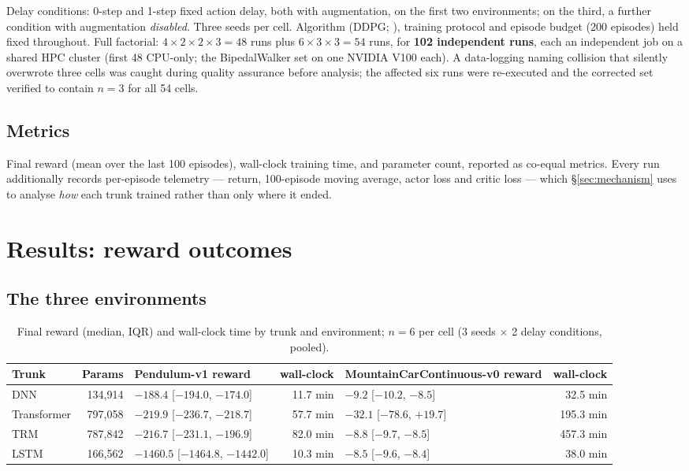 \documentclass[11pt]{article}
\begin{document}
Delay conditions: 0-step and 1-step fixed action delay, both with augmentation, on the first two environments; on the third, a further condition with augmentation \emph{disabled}. Three seeds per cell. Algorithm (DDPG; \citealp{lillicrap2016ddpg}), training protocol and episode budget (200 episodes) held fixed throughout. Full factorial: $4 \times 2 \times 2 \times 3 = 48$ runs plus $6 \times 3 \times 3 = 54$ runs, for \textbf{102 independent runs}, each an independent job on a shared HPC cluster (first 48 CPU-only; the BipedalWalker set on one NVIDIA V100 each). A data-logging naming collision that silently overwrote three cells was caught during quality assurance before analysis; the affected six runs were re-executed and the corrected set verified to contain $n=3$ for all 54 cells.

\subsection{Metrics}

Final reward (mean over the last 100 episodes), wall-clock training time, and parameter count, reported as co-equal metrics. Every run additionally records per-episode telemetry --- return, 100-episode moving average, actor loss and critic loss --- which \S\ref{sec:mechanism} uses to analyse \emph{how} each trunk trained rather than only where it ended.

\section{Results: reward outcomes}
\label{sec:results}

\subsection{The three environments}

\begin{table}[h]
\centering
\small
\begin{tabular}{lrlrlr}
\toprule
Trunk & Params & Pendulum-v1 reward & wall-clock & MountainCarContinuous-v0 reward & wall-clock \\
\midrule
DNN & 134{,}914 & $-188.4$ [$-194.0$, $-174.0$] & 11.7 min & $-9.2$ [$-10.2$, $-8.5$] & 32.5 min \\
Transformer & 797{,}058 & $-219.9$ [$-236.7$, $-218.7$] & 57.7 min & $-32.1$ [$-78.6$, $+19.7$] & 195.3 min \\
TRM & 787{,}842 & $-216.7$ [$-231.1$, $-196.9$] & 82.0 min & $-8.8$ [$-9.7$, $-8.5$] & 457.3 min \\
LSTM & 166{,}562 & $-1460.5$ [$-1464.8$, $-1442.0$] & 10.3 min & $-8.5$ [$-9.6$, $-8.4$] & 38.0 min \\
\bottomrule
\end{tabular}
\caption{Final reward (median, IQR) and wall-clock time by trunk and environment; $n=6$ per cell (3 seeds $\times$ 2 delay conditions, pooled).}
\label{tab:reward}
\end{table}
\end{document}
